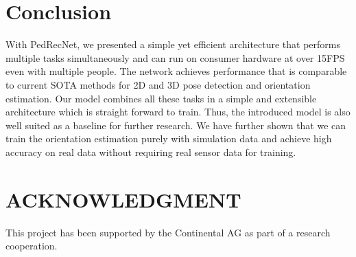 \documentclass[a4paper, 10pt, conference]{ieeeconf}
\begin{document}
\section{Conclusion}
With PedRecNet, we presented a simple yet efficient architecture that performs multiple tasks simultaneously and can run on consumer hardware at over 15FPS even with multiple people. The network achieves performance that is comparable to current SOTA methods for 2D and 3D pose detection and orientation estimation. Our model combines all these tasks in a simple and extensible architecture which is straight forward to train. Thus, the introduced model is also well suited as a baseline for further research. We have further shown that we can train the orientation estimation purely with simulation data and achieve high accuracy on real data without requiring real sensor data for training.

\section*{ACKNOWLEDGMENT}
This project has been supported by the Continental AG as part of a research cooperation.






\end{document}
